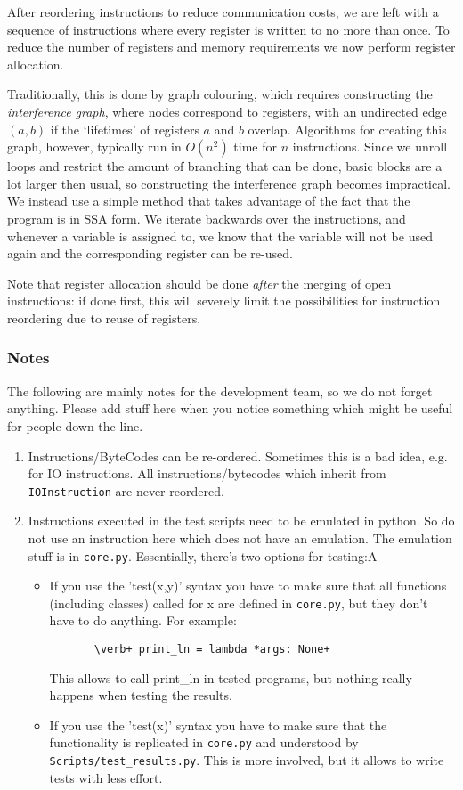 After reordering instructions to reduce communication costs, we are left with
a sequence of instructions where every register is written to no more than
once. To reduce the number of registers and memory requirements we now
perform register allocation.

Traditionally, this is done by graph colouring, which requires constructing
the \emph{interference
graph}, where nodes correspond to registers, with an undirected edge $(a,b)$ if
the `lifetimes' of registers $a$ and $b$ overlap. Algorithms for creating this
graph, however, typically run in $O(n^2)$ time for $n$ instructions. Since we
unroll loops and restrict the amount of branching that can be done, basic blocks
are a lot larger then usual, so constructing the interference graph becomes
impractical. We instead use a simple method that takes advantage of the fact
that the program is in SSA form. We iterate backwards over the instructions,
and whenever a variable is assigned to, we know that the variable will not be
used again and the corresponding register can be re-used.

Note that register allocation should be done \emph{after} the merging of open
instructions: if done first, this will severely limit the possibilities for
instruction reordering due to reuse of registers.


\subsubsection{Notes}
The following are mainly notes for the development team, so we
do not forget anything. Please add stuff here when you notice 
something which might be useful for people down the line.

\begin{enumerate}
\item Instructions/ByteCodes can be re-ordered. Sometimes this is a bad idea,
e.g. for IO instructions. All instructions/bytecodes which inherit from
\verb+IOInstruction+ are never reordered.
\item Instructions executed in the test scripts need to be emulated in
python. So do not use an instruction here which does not have an emulation.
The emulation stuff is in \verb+core.py+.
Essentially, there's two options for testing:A
\begin{itemize}
\item If you use the 'test(x,y)' syntax you have to make sure that all functions (including classes) called for x are defined in \verb+core.py+, but they don't have to do anything. For example: 
\begin{verbatim}
       \verb+ print_ln = lambda *args: None+
\end{verbatim}
This allows to call print_ln in tested programs, but nothing really happens when testing the results.
\item If you use the 'test(x)' syntax you have to make sure that the functionality is replicated in \verb+core.py+ and understood by \verb+Scripts/test_results.py+. This is more involved, but it allows to write tests with less effort. 
\end{itemize}
\end{enumerate}


